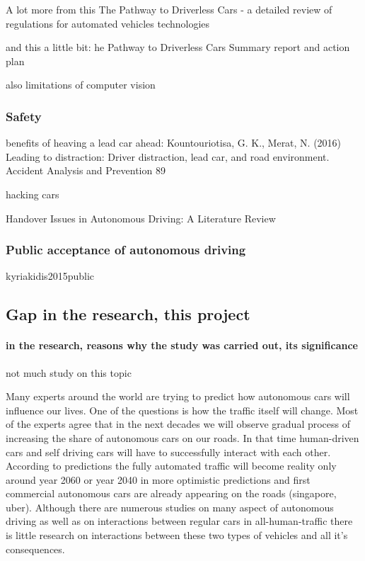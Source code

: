 \documentclass[11pt,english]{article}
\begin{document}
A lot more from this The Pathway to Driverless Cars - a detailed review of regulations for automated vehicles technologies

and this a little bit:
he Pathway to Driverless Cars Summary report and action plan

also limitations of computer vision


\subsubsection{Safety}



benefits of heaving a lead car ahead:
Kountouriotisa, G. K., Merat, N. (2016) Leading to distraction: Driver distraction, lead car, and road
environment. Accident Analysis and Prevention 89

hacking cars


Handover Issues in Autonomous Driving: A Literature Review


\subsubsection{Public acceptance of autonomous driving}

kyriakidis2015public





\subsection{Gap in the research, this project}

\paragraph{in the research, reasons why the study was carried out, its significance}

not much study on this topic


Many experts around the world are trying to predict how autonomous cars will influence our lives. One of the questions is how the traffic itself will change. Most of the experts agree that in the next decades we will observe gradual process of increasing the share of autonomous cars on our roads. In that time human-driven cars and self driving cars will have to successfully interact with each other. According to predictions the fully automated traffic will become reality only around year 2060 or year 2040 in more optimistic predictions and first commercial autonomous cars are already appearing on the roads (singapore, uber). Although there are numerous studies on many aspect of autonomous driving as well as on interactions between regular cars in all-human-traffic there is little research on interactions between these two types of vehicles and all it’s consequences.
\end{document}
